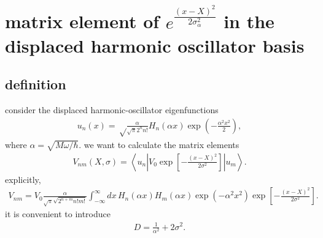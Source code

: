 \section{matrix element of $e^\frac{(x-X)^2}{2\sigma_\alpha^2}$ in the displaced harmonic oscillator basis}
\label{sec:osc-Vnm-displaced-basis}
\subsection{definition}
consider the displaced  harmonic-oscillator eigenfunctions
\begin{align}
    u_n(x)
    =
    \sqrt\frac{\alpha}{\sqrt{\pi}2^n n!}
    H_n(\alpha x)
    \exp\left(-\frac{\alpha^2x^2}{2}\right),
\end{align}
where $\alpha = \sqrt{M\omega/\hbar}$.
we want to calculate the matrix elements
\begin{align}
    V_{nm}(X,\sigma)
    =
    \left\langle u_n\left|V_0
    \exp\left[-\frac{(x-X)^2}{2\sigma^2}\right]
    \right|u_m\right\rangle .
\end{align}
explicitly,
\begin{align}
    V_{nm}
    =
    V_0 \frac{\alpha}{\sqrt{\pi}\sqrt{2^{n+m}n!m!}}
    \int_{-\infty}^{\infty} dx\,
    H_n(\alpha x)H_m(\alpha x)
    \exp\left(-\alpha^2 x^2\right)
    \exp\left[-\frac{(x-X)^2}{2\sigma^2}\right].
\end{align}
it is convenient to introduce
\begin{align}
    D=\frac{1}{\alpha^2}+2\sigma^2.
\end{align}


